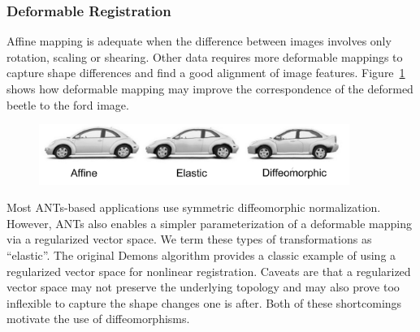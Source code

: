 \documentclass{InsightArticle}
\begin{document}
\subsubsection{Deformable Registration}
Affine mapping is adequate when the
difference between images involves only rotation, scaling or shearing.
Other data requires more deformable mappings to capture shape
differences and find a good alignment of image features.
Figure~\ref{fig:antshier} shows how deformable mapping may improve the
correspondence of the deformed beetle to the ford image.
\begin{figure}
\includegraphics[width=0.9\textwidth]{./Figures/ANTSElastToDiff.pdf} 
\vspace{-0.1in}
\label{fig:antshier}
\end{figure}
Most ANTs-based applications use symmetric diffeomorphic normalization.  However, 
ANTs also enables a simpler parameterization of a deformable mapping via a regularized 
vector space.  We term these types of transformations as ``elastic''.  The original Demons algorithm 
provides a classic example of using a regularized vector space for nonlinear registration.  
Caveats are that a regularized vector space may not preserve the underlying topology 
and may also prove too inflexible to capture the shape changes one is after.  Both of these 
shortcomings motivate the use of diffeomorphisms. 
\end{document}
